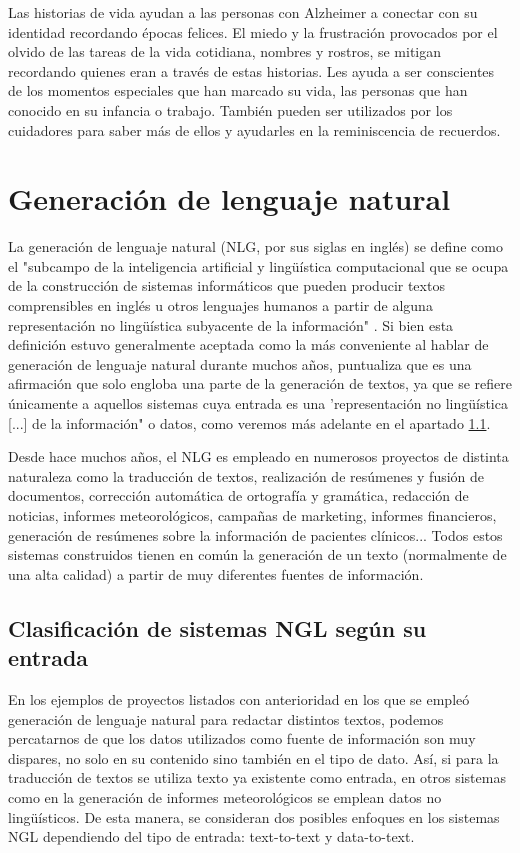 Las historias de vida ayudan a las personas con Alzheimer a conectar con su identidad recordando épocas felices. El miedo y la frustración provocados por el olvido de las tareas de la vida cotidiana, nombres y rostros, se mitigan recordando quienes eran a través de estas historias. Les ayuda a ser conscientes de los momentos especiales que han marcado su vida, las personas que han conocido en su infancia o trabajo. También pueden ser utilizados por los cuidadores para saber más de ellos y ayudarles en la reminiscencia de recuerdos. \citep{karlsson2014stories}



\section{Generación de lenguaje natural}

La generación de lenguaje natural (NLG, por sus siglas en inglés) se define como el "subcampo de la inteligencia artificial y lingüística computacional que se ocupa de la construcción de sistemas informáticos que pueden producir textos comprensibles en inglés u otros lenguajes humanos a partir de alguna representación no lingüística subyacente de la información"  \citep{reiter1997building}. Si bien esta definición estuvo generalmente aceptada como la más conveniente al hablar de generación de lenguaje natural durante muchos años, \cite{gatt2018survey} puntualiza que es una afirmación que solo engloba una parte de la generación de textos, ya que se refiere 
únicamente a aquellos sistemas cuya entrada es una 'representación no lingüística [...] de la información" o datos, como veremos más adelante en el apartado \ref{cap:ngltiposentrada}.

 Desde hace muchos años, el NLG es empleado en numerosos proyectos de distinta naturaleza como la traducción de textos, realización de resúmenes y fusión de documentos, corrección automática de ortografía y gramática, redacción de noticias, informes meteorológicos, campañas de marketing, informes financieros, generación de resúmenes sobre la información de pacientes clínicos... Todos estos sistemas construidos tienen en común la generación de un texto (normalmente de una alta calidad) a partir de muy diferentes fuentes de información. 

\subsection{Clasificación de sistemas NGL según su entrada}\label{cap:ngltiposentrada}
En los ejemplos de proyectos listados con anterioridad en los que se empleó generación de lenguaje natural para redactar distintos textos, podemos percatarnos de que los datos utilizados como fuente de información son muy dispares, no solo en su contenido sino también en el tipo de dato. Así, si para la traducción de textos se utiliza texto ya existente como entrada, en otros sistemas como en la generación de informes meteorológicos se emplean datos no lingüísticos. De esta manera, se consideran dos posibles enfoques en los sistemas NGL dependiendo del tipo de entrada: text-to-text y data-to-text.


